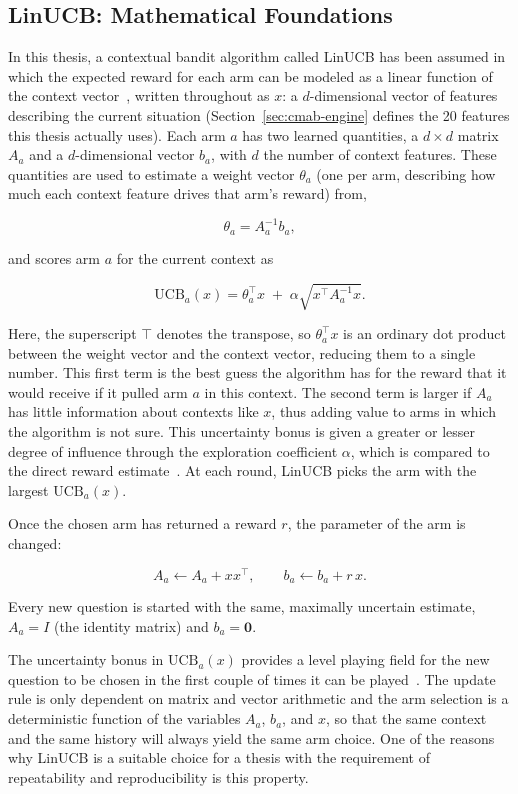 \documentclass[a4paper, 12pt, oneside, openany, BCOR1cm,toc=chapterentrywithdots]{scrbook}
\begin{document}
\subsection{LinUCB: Mathematical Foundations}

In this thesis, a contextual bandit algorithm called LinUCB has been assumed in which the
expected reward for each arm can be modeled as a linear function of the context
vector~\cite{li2010contextual,huang2016linucb}, written throughout as $x$: a $d$-dimensional
vector of features describing the current situation (Section~\ref{sec:cmab-engine} defines the
20 features this thesis actually uses). Each arm $a$ has two learned quantities, a $d \times d$
matrix $A_a$ and a $d$-dimensional vector $b_a$, with $d$ the number of context features. These
quantities are used to estimate a weight vector $\theta_a$ (one per arm, describing how much each
context feature drives that arm's reward) from,

\[
\theta_a = A_a^{-1} b_a ,
\]

and scores arm $a$ for the current context as

\[
\mathrm{UCB}_a(x) = \theta_a^\top x \; + \; \alpha \sqrt{x^\top A_a^{-1} x} .
\]

Here, the superscript $\top$ denotes the transpose, so $\theta_a^\top x$ is an ordinary dot
product between the weight vector and the context vector, reducing them to a single number. This
first term is the best guess the algorithm has for the reward that it
would receive if it pulled arm $a$ in this context. The second term is larger if $A_a$ has little
information about contexts like $x$, thus adding value to arms in which the algorithm is not
sure. This uncertainty bonus is given a greater or lesser degree of influence through the
exploration coefficient $\alpha$, which is compared to the direct reward
estimate~\cite{li2010contextual}. At each round, LinUCB picks the arm with the largest
$\mathrm{UCB}_a(x)$.

Once the chosen arm has returned a reward $r$, the parameter of the arm is changed:

\[
A_a \leftarrow A_a + x x^\top , \qquad b_a \leftarrow b_a + r\, x .
\]

Every new question is started with the same, maximally uncertain estimate, $A_a = I$ (the
identity matrix) and $b_a = \mathbf{0}$.

The uncertainty bonus in $\mathrm{UCB}_a(x)$ provides a level playing field for the new question
to be chosen in the first couple of times it can be played~\cite{li2010contextual}. The update
rule is only dependent on matrix and vector arithmetic and the arm selection is a deterministic
function of the variables $A_a$, $b_a$, and $x$, so that the same context and the same history
will always yield the same arm choice. One of the reasons why LinUCB is a suitable choice for a
thesis with the requirement of repeatability and reproducibility is this property.
\end{document}

